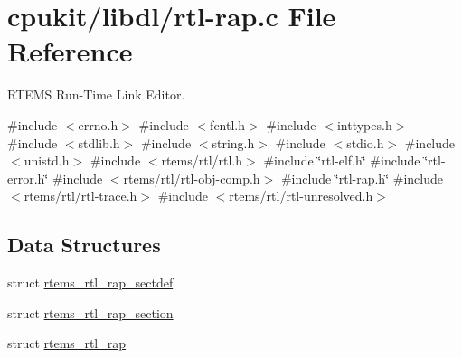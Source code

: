 \hypertarget{rtl-rap_8c}{}\section{cpukit/libdl/rtl-\/rap.c File Reference}
\label{rtl-rap_8c}


R\+T\+E\+MS Run-\/\+Time Link Editor.  


{\ttfamily \#include $<$errno.\+h$>$}\newline
{\ttfamily \#include $<$fcntl.\+h$>$}\newline
{\ttfamily \#include $<$inttypes.\+h$>$}\newline
{\ttfamily \#include $<$stdlib.\+h$>$}\newline
{\ttfamily \#include $<$string.\+h$>$}\newline
{\ttfamily \#include $<$stdio.\+h$>$}\newline
{\ttfamily \#include $<$unistd.\+h$>$}\newline
{\ttfamily \#include $<$rtems/rtl/rtl.\+h$>$}\newline
{\ttfamily \#include \char`\"{}rtl-\/elf.\+h\char`\"{}}\newline
{\ttfamily \#include \char`\"{}rtl-\/error.\+h\char`\"{}}\newline
{\ttfamily \#include $<$rtems/rtl/rtl-\/obj-\/comp.\+h$>$}\newline
{\ttfamily \#include \char`\"{}rtl-\/rap.\+h\char`\"{}}\newline
{\ttfamily \#include $<$rtems/rtl/rtl-\/trace.\+h$>$}\newline
{\ttfamily \#include $<$rtems/rtl/rtl-\/unresolved.\+h$>$}\newline
\subsection*{Data Structures}
\begin{DoxyCompactItemize}
\item 
struct \mbox{\hyperlink{structrtems__rtl__rap__sectdef}{rtems\+\_\+rtl\+\_\+rap\+\_\+sectdef}}
\item 
struct \mbox{\hyperlink{structrtems__rtl__rap__section}{rtems\+\_\+rtl\+\_\+rap\+\_\+section}}
\item 
struct \mbox{\hyperlink{structrtems__rtl__rap}{rtems\+\_\+rtl\+\_\+rap}}
\end{DoxyCompactItemize}
